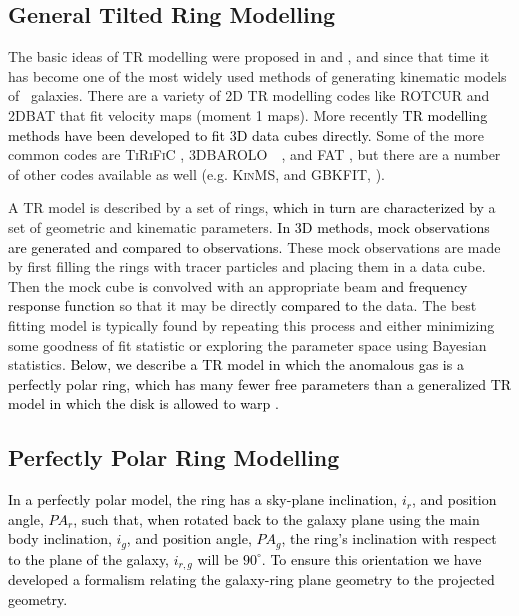 \documentclass[fleqn,usenatbib]{mnras}
\newcommand{\hi}{\text{H\,\sc{i}}}
\newcommand{\barolo}{\textsc{3DBAROLO}~}
\newcommand{\KS}[1]{\textcolor{black}{#1}}
\begin{document}
\subsection{General Tilted Ring Modelling}\label{SubSec:TRModelling}

The basic ideas of TR modelling were proposed in \citet{Warner1973} and \citet{Rogstad1974}, and since that time it has become one of the most widely used methods of generating kinematic models of \hi\ galaxies.  There are a variety of 2D TR modelling codes like \textsc{ROTCUR} \citep{Begeman1989,vanderHulst1992} and \textsc{2DBAT} \citep{Oh2018} that fit velocity maps (moment 1 maps).  More recently \textcolor{black}{TR modelling methods have been developed to fit 3D data cubes directly.}  Some of the more common codes are \textsc{TiRiFiC} \citep{Jorza2007}, \barolo\ \citep{diTeodoro15}, and \textsc{FAT} \citep{Kamphuis15}, but there are a number of other codes available as well (e.g. \textsc{KinMS}, \citealt{Davis2013} and \textsc{GBKFIT}, \citealt{Bekiaris2016}).

A TR model is described by a set of rings, \textcolor{black}{which in turn are characterized by} a set of geometric and kinematic parameters.  \textcolor{black}{In 3D methods, mock observations are generated and compared to observations.} These mock observations are made by first filling the rings with tracer particles and placing them in a data cube.  Then the mock cube \textcolor{black}{is} convolved with an appropriate beam \textcolor{black}{and frequency response function} so that it may be directly \textcolor{black}{compared to} the data.  The best fitting model is typically found by repeating this process and either minimizing some goodness of fit statistic or exploring the parameter space using Bayesian statistics. \KS{Below, we describe a TR  model in which the anomalous gas is a perfectly polar ring, which has many fewer free parameters than a generalized TR model in which the disk is allowed to warp \citep{Jorza2009, Arnaboldi1997}.}


\subsection{Perfectly Polar Ring Modelling}\label{SubSec:PRGFormalism}

\textcolor{black}{ \KS{In a perfectly polar model, the ring} has a sky-plane inclination, \textcolor{black}{$i_{r}$}, and position angle, $PA_{r}$, such that, when rotated back to the galaxy plane using the main body inclination, $i_{g}$, and position angle, $PA_{g}$, the \textcolor{black}{ring's inclination with respect to the plane of the galaxy, $i_{r,g}$ will be} $90^{\circ}$.  \textcolor{black}{To ensure this orientation} we have developed a formalism relating \textcolor{black}{the galaxy-ring} plane geometry to the projected geometry. }
\end{document}
